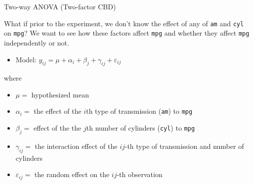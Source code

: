 \begin{frame}[fragile]{Two-way ANOVA (Two-factor CBD)}

What if prior to the experiment, we don't know the effect of any of
\texttt{am} and \texttt{cyl} on \texttt{mpg}? We want to see how these
factors affect \texttt{mpg} and whether they affect \texttt{mpg}
independently or not.

\begin{itemize}
\tightlist
\item
  Model:
  \(y_{ij}=\mu + \alpha_i + \beta_j + \gamma_{ij} +\varepsilon_{ij}\)
\end{itemize}

where

\begin{itemize}
\tightlist
\item
  \(\mu=\) hypothesized mean
\item
  \(\alpha_i=\) the effect of the \(i\)th type of transmission
  (\texttt{am}) to \texttt{mpg}
\item
  \(\beta_j=\) effect of the the \(j\)th number of cylinders
  (\texttt{cyl}) to \texttt{mpg}
\item
  \(\gamma_{ij}=\) the interaction effect of the \(ij\)-th type of
  transmission and number of cylinders
\item
  \(\varepsilon_{ij}=\) the random effect on the \(ij\)-th observation
\end{itemize}

\end{frame}

